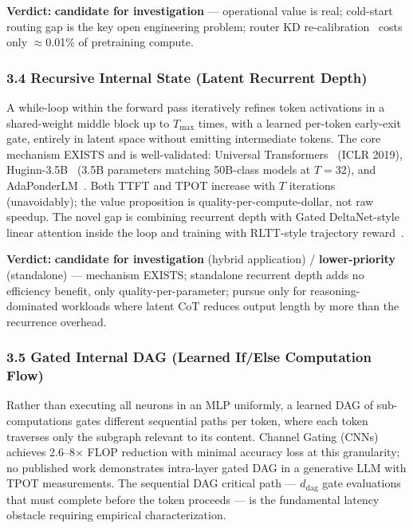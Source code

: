 \documentclass[11pt]{article}
\begin{document}
\textbf{Verdict:} \textbf{candidate for investigation} --- operational value is real; cold-start routing gap is the key open engineering problem; router KD re-calibration~\cite{RouterKD2025} costs only $\approx$0.01\% of pretraining compute.

\subsubsection{3.4 Recursive Internal State (Latent Recurrent Depth)}
\label{sec:idea_3_4}

A while-loop within the forward pass iteratively refines token activations in a shared-weight middle block up to $T_{\text{max}}$ times, with a learned per-token early-exit gate, entirely in latent space without emitting intermediate tokens.
The core mechanism EXISTS and is well-validated: Universal Transformers~\cite{Dehghani2019UT} (ICLR 2019), Huginn-3.5B~\cite{Geiping2025Huginn} (3.5B parameters matching 50B-class models at $T = 32$), and AdaPonderLM~\cite{Song2026AdaPonder}.
Both TTFT and TPOT increase with $T$ iterations (unavoidably); the value proposition is quality-per-compute-dollar, not raw speedup.
The novel gap is combining recurrent depth with Gated DeltaNet-style linear attention inside the loop and training with RLTT-style trajectory reward~\cite{Williams2026RLTT}.

\textbf{Verdict:} \textbf{candidate for investigation} (hybrid application) / \textbf{lower-priority} (standalone) --- mechanism EXISTS; standalone recurrent depth adds no efficiency benefit, only quality-per-parameter; pursue only for reasoning-dominated workloads where latent CoT reduces output length by more than the recurrence overhead.

\subsubsection{3.5 Gated Internal DAG (Learned If/Else Computation Flow)}
\label{sec:idea_3_5}

Rather than executing all neurons in an MLP uniformly, a learned DAG of sub-computations gates different sequential paths per token, where each token traverses only the subgraph relevant to its content.
Channel Gating (CNNs)~\cite{Hua2019ChannelGating} achieves 2.6--8$\times$ FLOP reduction with minimal accuracy loss at this granularity; no published work demonstrates intra-layer gated DAG in a generative LLM with TPOT measurements.
The sequential DAG critical path --- $d_{\text{dag}}$ gate evaluations that must complete before the token proceeds --- is the fundamental latency obstacle requiring empirical characterization.
\end{document}
